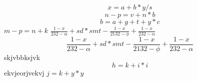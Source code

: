 $$x=a+b*y/s$$
$$n-p=v+n*b$$
\begin{equation}b=a+g+t+y*c\end{equation}
\(m-p=n+k\)
$\frac{1 - x}{232 - \alpha} + sd*smt -\frac{1 - x}{2132 - \phi} + \frac{1 - x}{232 - \alpha}$
\begin{equation}\frac{1 - x}{232 - \alpha} + sd*smt -\frac{1 - x}{2132 - \phi} + \frac{1 - x}{232 - \alpha}\end{equation}
skjvbbksjvk $$h=k+i*i$$ ekvjeorjvekvj
$j=k+y*y$
